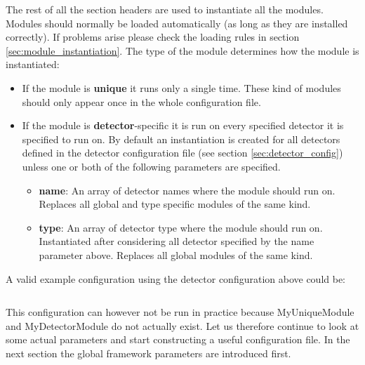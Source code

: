 The rest of all the section headers are used to instantiate all the modules. Modules should normally be loaded automatically (as long as they are installed correctly). If problems arise please check the loading rules in section \ref{sec:module_instantiation}. The type of the module determines how the module is instantiated:
\begin{itemize}
\item If the module is \textbf{unique} it runs only a single time. These kind of modules should only appear once in the whole configuration file.
\item If the module is \textbf{detector}-specific it is run on every specified detector it is specified to run on. By default an instantiation is created for all detectors defined in the detector configuration file (see section \ref{sec:detector_config}) unless one or both of the following parameters are specified.
\begin{itemize}
\item \textbf{name}: An array of detector names where the module should run on. Replaces all global and type specific modules of the same kind.
\item \textbf{type}: An array of detector type where the module should run on. Instantiated after considering all detector specified by the name parameter above. Replaces all global modules of the same kind. 
\end{itemize}
\end{itemize}

A valid example configuration using the detector configuration above could be:
\inputminted[frame=single,framesep=3pt,breaklines=true,tabsize=2,linenos]{ini}{../../etc/manual_detector_config.ini}

This configuration can however not be run in practice because MyUniqueModule and MyDetectorModule do not actually exist. Let us therefore continue to look at some actual parameters and start constructing a useful configuration file. In the next section the global framework parameters are introduced first.

